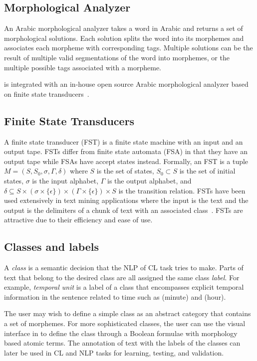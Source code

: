 \subsection{Morphological Analyzer}
An Arabic morphological analyzer takes a word in Arabic
and returns a set of morphological solutions. 
Each solution splits the word into its morphemes and 
associates each morpheme with corresponding tags. 
Multiple solutions can be the result of multiple valid 
segmentations of the word into morphemes, or the multiple 
possible tags associated with a morpheme. 

\framework is integrated with an in-house open source Arabic morphological analyzer
based on finite state transducers~\cite{ZaMaColing2012DemosSarf}.

\subsection{Finite State Transducers}
A finite state transducer (FST) is a finite state machine with an input and an output tape. 
FSTs differ from finite state automata (FSA) in that
they have an output tape while FSAs have accept states instead.
Formally, an FST is a tuple $M = (S,S_{0},\sigma,\varGamma,\delta)$ where $S$ is the set of states,
$S_{0} \subset S$ is the set of initial states, 
$\sigma$ is the input alphabet, 
$\varGamma$ is the output alphabet, 
and $\delta \subseteq S \times (\sigma \times \{\epsilon\}) \times (\varGamma \times \{\epsilon\}) \times S$ is the transition relation. 
FSTs have been used extensively in text mining applications where the input is the text and the output is the
delimiters of a chunk of text with an associated class~\cite{beesley2001finite}. 
FSTs are attractive due to their efficiency and ease of use.

\subsection{Classes and labels}
A {\em class} is a semantic decision that the NLP of CL task tries to make. 
Parts of text that belong to the desired class are all assigned the same class {\em label}. 
For example, {\em temporal unit} is a label of a class that encompasses explicit temporal 
information in the sentence related to time such as 
 (minute) and  (hour). 

The user may wish to define a simple class as an abstract category that contains a 
set of morphemes. 
For more sophisticated classes, the user can use the visual interface in \framework to 
define the class through a Boolean formulae with morphology based atomic terms. 
The annotation of text with the labels of the classes can later be used in 
CL and NLP tasks for learning, testing, and validation. 
